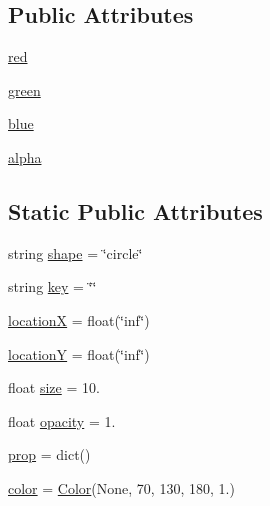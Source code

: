 \subsection*{Public Attributes}
\begin{DoxyCompactItemize}
\item 
\mbox{\hyperlink{class_bridges_1_1_element_visualizer_1_1_element_visualizer_a44266d81c1904956ae315cefa1cee31a}{red}}
\item 
\mbox{\hyperlink{class_bridges_1_1_element_visualizer_1_1_element_visualizer_a3c23b7a96237fe6e19e498388a199ab5}{green}}
\item 
\mbox{\hyperlink{class_bridges_1_1_element_visualizer_1_1_element_visualizer_ae362091ff72d0848cc387b88ab75d1ab}{blue}}
\item 
\mbox{\hyperlink{class_bridges_1_1_element_visualizer_1_1_element_visualizer_af409ee373431b9dfb0a2266ff5128c84}{alpha}}
\end{DoxyCompactItemize}
\subsection*{Static Public Attributes}
\begin{DoxyCompactItemize}
\item 
string \mbox{\hyperlink{class_bridges_1_1_element_visualizer_1_1_element_visualizer_a1ae8dcb88a4ccb84df24aafed271ea7f}{shape}} = \char`\"{}circle\char`\"{}
\item 
string \mbox{\hyperlink{class_bridges_1_1_element_visualizer_1_1_element_visualizer_ae811539c6b7d514dcaead30f0288c87d}{key}} = \char`\"{}\char`\"{}
\item 
\mbox{\hyperlink{class_bridges_1_1_element_visualizer_1_1_element_visualizer_af7cd9fba1cd632efc802156d5f358c23}{locationX}} = float(\char`\"{}inf\char`\"{})
\item 
\mbox{\hyperlink{class_bridges_1_1_element_visualizer_1_1_element_visualizer_a8905c116a3b0c9f0d0dc7784f4677804}{locationY}} = float(\char`\"{}inf\char`\"{})
\item 
float \mbox{\hyperlink{class_bridges_1_1_element_visualizer_1_1_element_visualizer_a5d3eefae7745c6db65147c7b1361d208}{size}} = 10.
\item 
float \mbox{\hyperlink{class_bridges_1_1_element_visualizer_1_1_element_visualizer_ab26841a89ad63bac0828c15b01ec92b2}{opacity}} = 1.
\item 
\mbox{\hyperlink{class_bridges_1_1_element_visualizer_1_1_element_visualizer_a16321e9ca1451a4eb1e2b58d22fa3211}{prop}} = dict()
\item 
\mbox{\hyperlink{class_bridges_1_1_element_visualizer_1_1_element_visualizer_ab067bb0c9acc370a93b87f15bd7d6e6e}{color}} = \mbox{\hyperlink{class_bridges_1_1_color_1_1_color}{Color}}(None, 70, 130, 180, 1.)
\end{DoxyCompactItemize}


